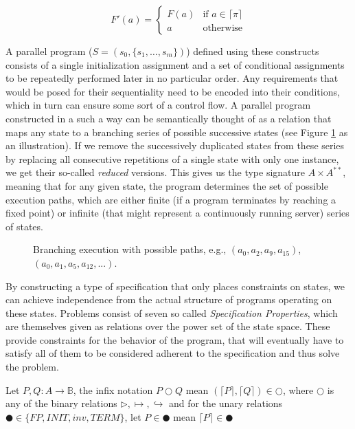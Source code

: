 \begin{equation}
    F'(a) = 
    \left\{
    	\begin{array}{ll}
    		F(a) & \mbox{if } a \in \lceil \pi \rceil \\
    		a & \mbox{otherwise}
    	\end{array}
    \right.
\end{equation}

A parallel program ($S = (s_0, \{s_1, \ldots, s_m\})$) defined using these constructs consists of a single initialization assignment and a set of conditional assignments to be repeatedly performed later in no particular order. Any requirements that would be posed for their sequentiality need to be encoded into their conditions, which in turn can ensure some sort of a control flow. A parallel program constructed in a such a way can be semantically thought of as a relation that maps any state to a branching series of possible successive states (see Figure \ref{fig:branching-execution} as an illustration). If we remove the successively duplicated states from these series by replacing all consecutive repetitions of a single state with only one instance, we get their so-called \textit{reduced} versions. This gives us the type signature $A \times A^{**}$, meaning that for any given state, the program determines the set of possible execution paths, which are either finite (if a program terminates by reaching a fixed point) or infinite (that might represent a continuously running server) series of states.

\begin{figure}[H]
    \centering
    
    \caption{Branching execution with possible paths, e.g., $(a_0,a_2,a_9,a_{15})$, $(a_0,a_1,a_5,a_{12},...)$.}
    \label{fig:branching-execution}
\end{figure}

By constructing a type of specification that only places constraints on states, we can achieve independence from the actual structure of programs operating on these states. Problems consist of seven so called \textit{Specification Properties}, which are themselves given as relations over the power set of the state space. These provide constraints for the behavior of the program, that will eventually have to satisfy all of them to be considered adherent to the specification and thus solve the problem.

Let $P, Q : A \to \mathbb{B}$, the infix notation $P \Circle Q$ mean $(\lceil P
\rceil , \lceil Q \rceil) \in \Circle$, where $\Circle$ is any of the binary
relations $\rhd, \mapsto, \hookrightarrow$ and for the unary relations $\CIRCLE
\in \{FP, INIT, inv, TERM\}$, let $P \in \CIRCLE$ mean $\lceil P \rceil \in
\CIRCLE$

